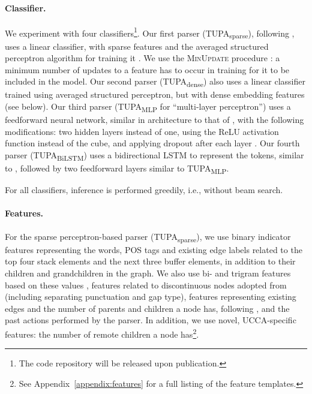 \documentclass[11pt,a4paper]{article}
\newcommand{\parser}[1]{TUPA\textsubscript{#1}}
\begin{document}
\paragraph{Classifier.}
We experiment with four classifiers\footnote{The code repository will
be released upon publication.}.
Our first parser (\parser{sparse}), following \citet{maier-lichte:2016:DiscoNLP},
uses a linear classifier, with sparse features and
the averaged structured perceptron algorithm for training it
\cite{Coll:04}. We use the \textsc{MinUpdate} procedure \cite{goldberg2011learning}:
a minimum number of updates to a feature has to occur in training for it
to be included in the model.
Our second parser (\parser{dense}) also uses a linear classifier
trained using averaged structured perceptron, but with dense embedding features (see below).
Our third parser (\parser{MLP} for ``multi-layer perceptron'') uses a feedforward neural network,
similar in architecture to that of \citet{chen2014fast}, with the following modifications:
two hidden layers instead of one, using the ReLU activation function instead of the cube,
and applying dropout after each layer \cite{srivastava2014dropout}.
Our fourth parser (\parser{BiLSTM}) uses a bidirectional LSTM to represent the tokens,
similar to \cite{kiperwasser2016simple}, followed by two feedforward layers similar to \parser{MLP}.

For all classifiers, inference is performed greedily, i.e., without beam search.

\paragraph{Features.}
For the sparse perceptron-based parser (\parser{sparse}),
we use binary indicator features representing
the words, POS tags and existing edge labels related to the top four stack elements and the 
next three buffer elements, in addition to their children and grandchildren in the graph.
We also use bi- and trigram features based on these values \cite{zhang2009transition,zhu2013fast},
features related to discontinuous nodes adopted from \citet{maier2015discontinuous}
(including separating punctuation and gap type),
features representing existing edges and the number of parents and children a node has, following \citet{tokgoz2015transition},
and the past actions performed by the parser.
In addition, we use novel, UCCA-specific features:
the number of remote children a node has\footnote{See
Appendix~\ref{appendix:features} for a full listing of the feature templates.}.
\end{document}
